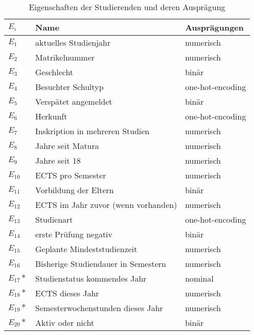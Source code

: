 \begin{table}[ht]
  \caption{\label{tab:name} Eigenschaften der Studierenden und deren Auspr\"agung}
  \begin{tabular}{ p{1cm} p{7cm}  p{5cm} }
    \toprule
    $E_i$     & Name                                & Ausprägungen     \\
    \midrule
    $E_1$     & aktuelles Studienjahr               & numerisch        \\
    $E_2$     & Matrikelnummer                      & numerisch        \\
    $E_3$     & Geschlecht                          & binär            \\
    $E_4$     & Besuchter Schultyp                  & one-hot-encoding \\
    $E_5$     & Verspätet angemeldet                & binär            \\
    $E_6$     & Herkunft                            & one-hot-encoding \\
    $E_7$     & Inskription in mehreren Studien     & numerisch        \\
    $E_8$     & Jahre seit Matura                   & numerisch        \\
    $E_9$     & Jahre seit 18                       & numerisch        \\
    $E_{10}$  & ECTS pro Semester                   & numerisch        \\
    $E_{11}$  & Vorbildung der Eltern               & binär            \\
    $E_{12}$  & ECTS im Jahr zuvor (wenn vorhanden) & numerisch        \\
    $E_{13}$  & Studienart                          & one-hot-encoding \\
    $E_{14}$  & erste Prüfung negativ               & binär            \\
    $E_{15}$  & Geplante Mindeststudienzeit         & numerisch        \\
    $E_{16}$  & Bisherige Studiendauer in Semestern & numerisch        \\
    $E_{17}*$ & Studienstatus kommendes Jahr        & nominal          \\
    $E_{18}*$ & ECTS dieses Jahr                    & numerisch        \\
    $E_{19}*$ & Semesterwochenstunden dieses Jahr   & numerisch        \\
    $E_{20}*$ & Aktiv oder nicht                    & binär            \\
    \bottomrule
  \end{tabular}

\end{table}

